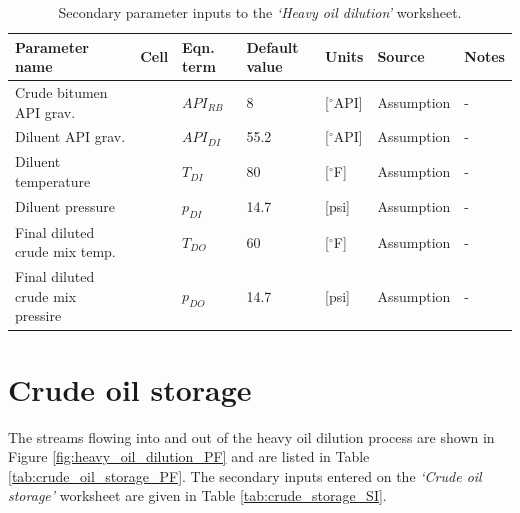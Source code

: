 \documentclass[11pt]{report}
\newcommand{\cellref}[1]{\raisebox{1pt}{\fcolorbox{stanford}{light-gray}{\texttt{\textcolor{stanford}{\scriptsize{#1}}}}}}
\newcommand{\sheet}[1]{\textit{`{#1}'}}
\begin{document}
\begin{table}
\caption{Secondary parameter inputs to the \sheet{Heavy oil dilution} worksheet.}
\label{tab:HO_dilution_SI}
\begin{scriptsize}
\begin{tabularx}{1\columnwidth}{p{}p{}p{}p{}p{}p{}p{}}
\toprule
Parameter name			& Cell	& Eqn. term		& Default value   		& Units 	& Source			      			& Notes 		\\ 
\midrule
Crude bitumen API grav.		& \cellref{M43}	& $API_{RB}$		& 8					& [$^\circ$API]		& Assumption		& -			\\
Diluent API grav.			& \cellref{M44}	& $API_{DI}$		& 55.2				& [$^\circ$API]		& Assumption		& -			\\
Diluent temperature			& \cellref{M47}	& $T_{DI}$		& 80					& [$^\circ$F]		& Assumption		& -			\\
Diluent pressure			& \cellref{M48}	& $p_{DI}$		& 14.7				& [psi]			& Assumption		& -			\\
Final diluted crude mix temp.	& \cellref{M49}	& $T_{DO}$		& 60					& [$^\circ$F]		& Assumption		& -			\\
Final diluted crude mix pressire	& \cellref{M50}	& $p_{DO}$		& 14.7				& [psi]			& Assumption		& -			\\
\bottomrule
\end{tabularx}
\end{scriptsize}
\end{table}



\clearpage



\section{Crude oil storage}
\label{sec:Storage}
The streams flowing into and out of the heavy oil dilution process are shown in Figure \ref{fig:heavy_oil_dilution_PF} and are listed in Table \ref{tab:crude_oil_storage_PF}.  The secondary inputs entered on the \sheet{Crude oil storage} worksheet are given in Table \ref{tab:crude_storage_SI}.
\end{document}
